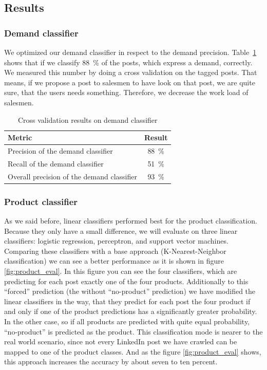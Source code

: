 \subsection{Results}
\label{sub:results}

\subsubsection{Demand classifier}
\label{ssub:demand_classifier}

We optimized our demand classifier in respect to the demand precision.
Table~\ref{table:demand_evaluation} shows that if we classify 88~\% of the posts, which express a demand, correctly.
We measured this number by doing a cross validation on the tagged posts.
That means, if we propose a post to salesmen to have look on that post, we are quite sure, that the users needs something.
Therefore, we decrease the work load of salesmen.

\begin{table}[h]
	\centering
	\begin{tabular}{lc}
		\hline
		\textbf{Metric} & \textbf{Result}  \\
		\hline
		\hline
		Precision of the demand classifier & 88~\% \\
		\hline
		Recall of the demand classifier & 51~\%  \\
		\hline
		Overall precision of the demand classifier & 93~\%  \\
		\hline
	\end{tabular}
	\caption{Cross validation results on demand classifier}
	\label{table:demand_evaluation}
\end{table}

\subsubsection{Product classifier}
\label{ssub:product_classifier}

As we said before, linear classifiers performed best for the product classification.
Because they only have a small difference, we will evaluate on three linear classifiers: logistic regression, perceptron, and support vector machines.
Comparing these classifiers with a base approach (K-Nearest-Neighbor classification) we can see a better performance as it is shown in figure \ref{fig:product_eval}.
In this figure you can see the four classifiers, which are predicting for each post exactly one of the four products.
Additionally to this ``forced'' prediction (the without ``no-product'' prediction) we have modified the linear classifiers in the way, that they predict for each post the four product if and only if one of the product predictions has a significantly greater probability.
In the other case, so if all products are predicted with quite equal probability, ``no-product'' is predicted as the product.
This classification mode is nearer to the real world scenario, since not every LinkedIn post we have crawled can be mapped to one of the product classes.
And as the figure \ref{fig:product_eval} shows, this approach increases the accuracy by about seven to ten percent.

